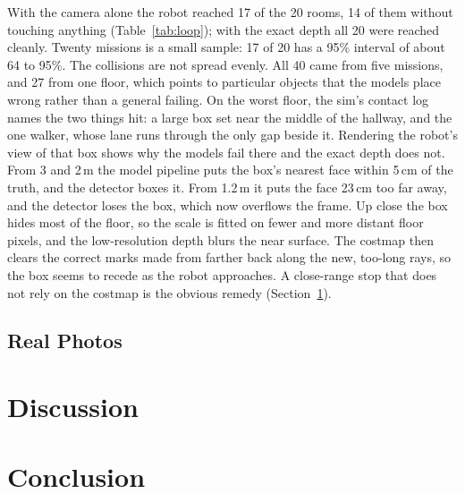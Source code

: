 \documentclass[conference]{IEEEtran}
\begin{document}
With the camera alone the robot reached 17 of the 20 rooms, 14 of them
without touching anything (Table~\ref{tab:loop}); with the exact depth all
20 were reached cleanly. Twenty missions is a small sample: 17 of 20 has a
95\% interval of about 64 to 95\%. The collisions are not spread evenly.
All 40 came from five missions, and 27 from one floor, which points to
particular objects that the models place wrong rather than a general
failing. On the worst floor, the sim's contact log names the two things
hit: a large box set near the middle of the hallway, and the one walker,
whose lane runs through the only gap beside it. Rendering the robot's view
of that box shows why the models fail there and the exact depth does not.
From 3 and 2\,m the model pipeline puts the box's nearest face within
5\,cm of the truth, and the detector boxes it. From 1.2\,m it puts the face
23\,cm too far away, and the detector loses the box, which now overflows
the frame. Up close the box hides most of the floor, so the scale is fitted
on fewer and more distant floor pixels, and the low-resolution depth blurs
the near surface. The costmap then clears the correct marks made from
farther back along the new, too-long rays, so the box seems to recede as the
robot approaches. A close-range stop that does not rely on the costmap is
the obvious remedy (Section~\ref{sec:discussion}).

\subsection{Real Photos}
\label{sec:real}

\section{Discussion}
\label{sec:discussion}

\section{Conclusion}



\end{document}
